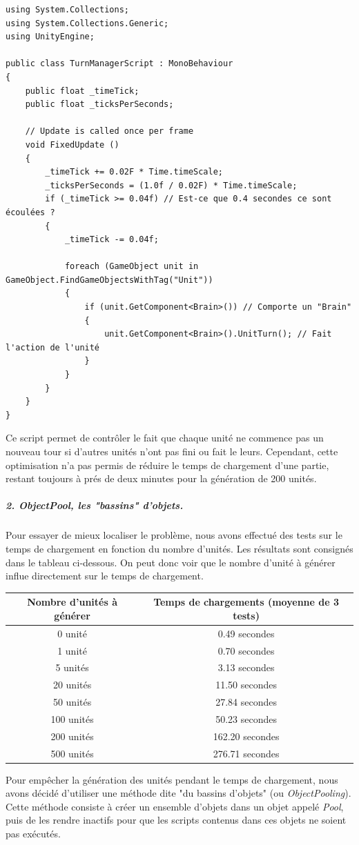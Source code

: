 \documentclass{report}
\begin{document}
 \begin{lstlisting}[language={[Sharp]C},label={lst:turnManagerScript}, caption= Code du script TurnManagerScript.cs]
using System.Collections;
using System.Collections.Generic;
using UnityEngine;

public class TurnManagerScript : MonoBehaviour
{
    public float _timeTick;
    public float _ticksPerSeconds;
    
    // Update is called once per frame
	void FixedUpdate ()
    {
        _timeTick += 0.02F * Time.timeScale;
        _ticksPerSeconds = (1.0f / 0.02F) * Time.timeScale;
        if (_timeTick >= 0.04f) // Est-ce que 0.4 secondes ce sont écoulées ?
        {
            _timeTick -= 0.04f;

            foreach (GameObject unit in GameObject.FindGameObjectsWithTag("Unit"))
            {
                if (unit.GetComponent<Brain>()) // Comporte un "Brain"
                {
                    unit.GetComponent<Brain>().UnitTurn(); // Fait l'action de l'unité
                }
            }
        }
	}
}
\end{lstlisting}
Ce script permet de contrôler le fait que chaque unité ne commence pas un nouveau tour si d'autres unités n'ont pas fini ou fait le leurs.
Cependant, cette optimisation n'a pas permis de réduire le temps de chargement d'une partie, restant toujours à prés de deux minutes pour la génération de 200 unités.

\subparagraph{2. \textit{ObjectPool}, les "bassins" d'objets.}Pour essayer de mieux localiser le problème, nous avons effectué des tests sur le temps de chargement en fonction du nombre d'unités. Les résultats sont consignés dans le tableau ci-dessous. On peut donc voir que le nombre d'unité à générer influe directement sur le temps de chargement.\newline
\begin{center}
\begin{tabular}{c|c}
  \hline
  Nombre d'unités à générer & Temps de chargements (moyenne de 3 tests) \\
  \hline
  0 unité & 0.49 secondes \\
  1 unité & 0.70 secondes \\
  5 unités & 3.13 secondes \\
  20 unités & 11.50 secondes \\
  50 unités & 27.84 secondes \\
  100 unités & 50.23 secondes \\
  200 unités & 162.20 secondes \\
  500 unités & 276.71 secondes \\
  \hline
\end{tabular}
\end{center}
Pour empêcher la génération des unités pendant le temps de chargement, nous avons décidé d'utiliser une méthode dite "du bassins d'objets" (ou \textit{ObjectPooling}). Cette méthode consiste à créer un ensemble d'objets dans un objet appelé \textit{Pool}, puis de les rendre inactifs pour que les scripts contenus dans ces objets ne soient pas exécutés.
\end{document}
